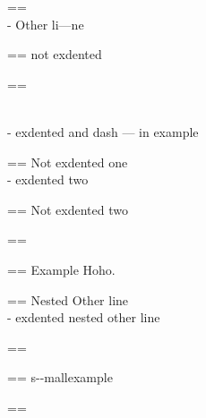 \documentclass{book}
\makeatletter
\newenvironment{GNUTexinfopreformatted}{%
  \par\GNUTobeylines\obeyspaces\frenchspacing
  \parskip=\z@\parindent=\z@}{}
{\catcode`\^^M=13 \gdef\GNUTobeylines{\catcode`\^^M=13 \def^^M{\null\par}}}
\newenvironment{GNUTexinfoindented}
  {\begin{list}{}{}
  \item\relax}
  {\end{list}}
\makeatother
\begin{document}
\begin{GNUTexinfoindented}
\begin{GNUTexinfoindented}
\begin{GNUTexinfopreformatted}
\end{GNUTexinfopreformatted}
\leavevmode{}\\
\hbox{\kern -\leftmargin}%
Other li---ne
\\
\begin{GNUTexinfopreformatted}%
\ttfamily not exdented
\end{GNUTexinfopreformatted}
\end{GNUTexinfoindented}
\begin{GNUTexinfopreformatted}%
\ttfamily 
\end{GNUTexinfopreformatted}
\begin{GNUTexinfoindented}
\leavevmode{}\\
\hbox{\kern -\leftmargin}%
exdented  and dash --- in example
\\
\begin{GNUTexinfopreformatted}%
\ttfamily Not exdented one
\end{GNUTexinfopreformatted}
\leavevmode{}\\
\hbox{\kern -\leftmargin}%
exdented two
\\
\begin{GNUTexinfopreformatted}%
\ttfamily Not exdented two
\end{GNUTexinfopreformatted}
\end{GNUTexinfoindented}
\begin{GNUTexinfopreformatted}%
\ttfamily 
\end{GNUTexinfopreformatted}
\begin{GNUTexinfoindented}
\begin{GNUTexinfopreformatted}%
\ttfamily Example   Hoho.
\end{GNUTexinfopreformatted}
\begin{GNUTexinfoindented}
\begin{GNUTexinfopreformatted}%
\ttfamily Nested Other line
\end{GNUTexinfopreformatted}
\leavevmode{}\\
\hbox{\kern -\leftmargin}%
exdented nested other line
\\
\end{GNUTexinfoindented}
\end{GNUTexinfoindented}
\begin{GNUTexinfopreformatted}%
\ttfamily 
\end{GNUTexinfopreformatted}
\begin{GNUTexinfopreformatted}%
\ttfamily \footnotesize s{-}{-}mallexample
\end{GNUTexinfopreformatted}
\begin{GNUTexinfopreformatted}%

\end{GNUTexinfopreformatted}
\end{GNUTexinfoindented}
\end{document}
